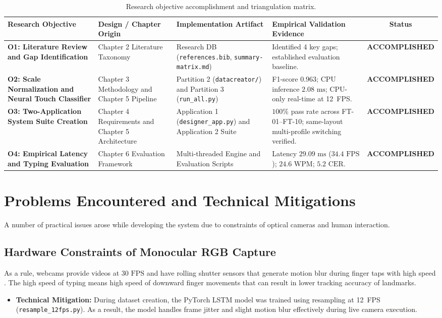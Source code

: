 \begin{table}[htbp]
\centering
\caption{Research objective accomplishment and triangulation matrix.}
\label{tab:objective_triangulation_summary}
\begin{tabular}{p{3.5cm} p{3.5cm} p{4.0cm} p{3.5cm} c}
\toprule
\textbf{Research Objective} & \textbf{Design / Chapter Origin} & \textbf{Implementation Artifact} & \textbf{Empirical Validation Evidence} & \textbf{Status} \\
\midrule
\textbf{O1: Literature Review and Gap Identification} & Chapter 2 Literature Taxonomy & Research DB (\texttt{references.bib}, \texttt{summary-matrix.md}) & Identified 4 key gaps; established evaluation baseline. & \textbf{ACCOMPLISHED} \\
\midrule
\textbf{O2: Scale Normalization and Neural Touch Classifier} & Chapter 3 Methodology and Chapter 5 Pipeline & Partition 2 (\texttt{datacreator/}) and Partition 3 (\texttt{run\_all.py}) & F1-score $0.963$; CPU inference $2.08\text{ ms}$; CPU-only real-time at 12~FPS. & \textbf{ACCOMPLISHED} \\
\midrule
\textbf{O3: Two-Application System Suite Creation} & Chapter 4 Requirements and Chapter 5 Architecture & Application 1 (\texttt{designer\_app.py}) and Application 2 Suite & $100\%$ pass rate across FT-01--FT-10; same-layout multi-profile switching verified. & \textbf{ACCOMPLISHED} \\
\midrule
\textbf{O4: Empirical Latency and Typing Evaluation} & Chapter 6 Evaluation Framework & Multi-threaded Engine and Evaluation Scripts & Latency $29.09\text{ ms}$ ($34.4\text{ FPS}$); $24.6\text{ WPM}$; $5.2\text{ CER}$. & \textbf{ACCOMPLISHED} \\
\bottomrule
\end{tabular}%
\end{table}

\section{Problems Encountered and Technical Mitigations}
\label{sec:concl_problems}
A number of practical issues arose while developing the system due to constraints of optical cameras and human interaction.

\subsection{Hardware Constraints of Monocular RGB Capture}
As a rule, webcams provide videos at $30\text{ FPS}$ and have rolling shutter sensors that generate motion blur during finger taps with high speed \cite{Thomas2013Camera}. The high speed of typing means high speed of downward finger movements that can result in lower tracking accuracy of landmarks.
\begin{itemize}
    \item \textbf{Technical Mitigation:} During dataset creation, the PyTorch LSTM model was trained using resampling at 12~FPS (\texttt{resample\_12fps.py}). As a result, the model handles frame jitter and slight motion blur effectively during live camera execution.
\end{itemize}

